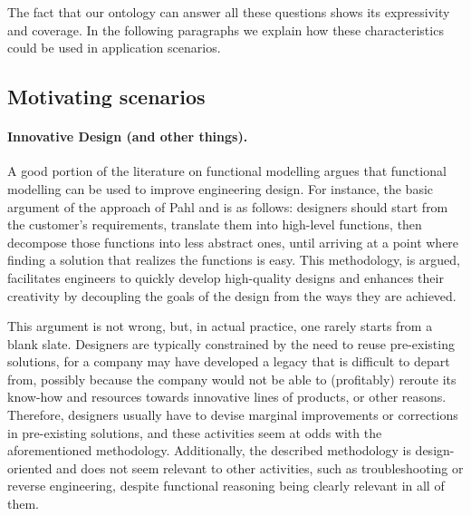 \documentclass[sw]{iosart2x}
\begin{document}
\medskip
The fact that our ontology can answer all these questions shows its expressivity and coverage.
In the following paragraphs we explain how these characteristics could be used in application scenarios.


\subsection{Motivating scenarios}
\paragraph{Innovative Design (and other things).}
A good portion of the literature on functional modelling argues that functional modelling can be used to improve engineering design.
For instance, the basic argument of the approach of Pahl and \cite{pahl_engineering_2007} is as follows: designers should start from the customer's requirements, translate them into high-level functions, then decompose those functions into less abstract ones, until arriving at a point where finding a solution that realizes the functions is easy.
This methodology, is argued, facilitates engineers to quickly develop high-quality designs and enhances their creativity by decoupling the goals of the design from the ways they are achieved.

This argument is not wrong, but, in actual practice, one rarely starts from a blank slate. 
Designers are typically constrained by the need to reuse pre-existing solutions, for a company may have developed a legacy that is difficult to depart from, possibly because the company would not be able to (profitably) reroute its know-how and resources towards innovative lines of products, or other reasons.
Therefore, designers usually have to devise marginal improvements or corrections in pre-existing solutions, and these activities seem at odds with the aforementioned methodology. %
Additionally, the described methodology is design-oriented and does not seem relevant to other activities, such as troubleshooting or reverse engineering, despite functional reasoning being clearly relevant in all of them.
\end{document}
